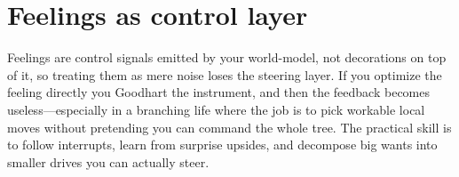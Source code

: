\part{Feelings as control layer}
\epigraph{Feelings are control signals emitted by your world-model, not decorations on top of it, so treating them as mere noise loses the steering layer. If you optimize the feeling directly you Goodhart the instrument, and then the feedback becomes useless---especially in a branching life where the job is to pick workable local moves without pretending you can command the whole tree. The practical skill is to follow interrupts, learn from surprise upsides, and decompose big wants into smaller drives you can actually steer.}{}
\clearpage
